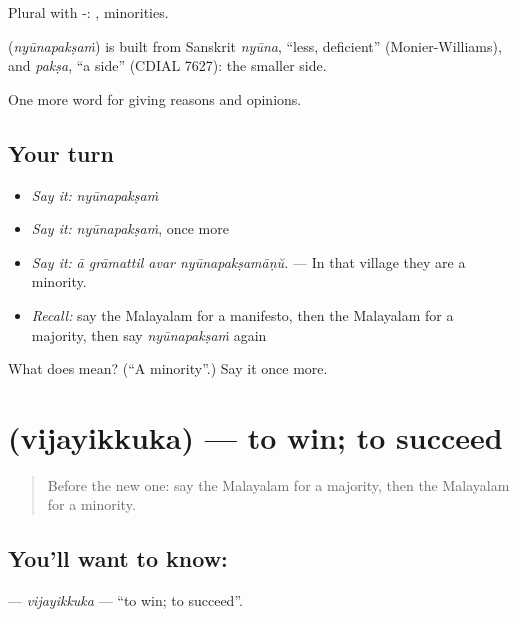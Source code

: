 Plural with -: , minorities.

\begin{cousinweb}
\textbf{} (\emph{nyūnapakṣaṁ}) is built from Sanskrit \emph{nyūna}, \textquotedblleft{}less, deficient\textquotedblright{} (Monier-Williams), and \emph{pakṣa}, \textquotedblleft{}a side\textquotedblright{} (CDIAL 7627): the smaller side.
\end{cousinweb}

\begin{grammarlens}[title={What you've built}]
One more word for giving reasons and opinions.
\end{grammarlens}

\subsection*{Your turn}
\begin{itemize}
\raggedright
  \item \emph{Say it:} \emph{nyūnapakṣaṁ}
  \item \emph{Say it:} \emph{nyūnapakṣaṁ}, once more
  \item \emph{Say it:} \emph{ā grāmattil avar nyūnapakṣamāṇŭ.} — In that village they are a minority.
  \item \emph{Recall:} say the Malayalam for a manifesto, then the Malayalam for a majority, then say \emph{nyūnapakṣaṁ} again
\end{itemize}

\begin{tcolorbox}[breakable,colback=teal!4,colframe=teal!35!black,title={Before you move on}]
What does  mean? (\textquotedblleft{}A minority\textquotedblright{}.) Say it once more.
\end{tcolorbox}
\section[\texorpdfstring{\ml{വിജയിക്കുക} (vijayikkuka)}{വിജയിക്കുക (vijayikkuka)}]{ (vijayikkuka) — to win; to succeed}

\label{lesson:ML-C420-vijayikkuka}



\begin{quote}
Before the new one: say the Malayalam for a majority, then the Malayalam for a minority.
\end{quote}

\subsection*{You'll want to know: }
\textbf{} — \emph{vijayikkuka} — \textquotedblleft{}to win; to succeed\textquotedblright{}.

